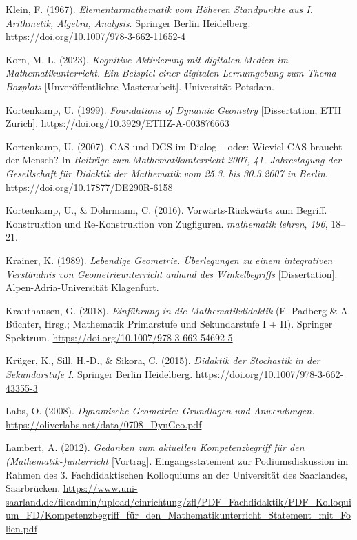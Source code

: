 \documentclass[
]{scrbook}
\newlength{\cslhangindent}
\newenvironment{CSLReferences}[2] %
 {\begin{list}{}{%
  \setlength{\itemindent}{0pt}
  \setlength{\leftmargin}{0pt}
  \setlength{\parsep}{0pt}
  \ifodd #1
   \setlength{\leftmargin}{\cslhangindent}
   \setlength{\itemindent}{-1\cslhangindent}
  \fi
  \setlength{\itemsep}{#2\baselineskip}}}
 {\end{list}}
\theoremstyle{definition}
\theoremstyle{definition}
\theoremstyle{definition}
\theoremstyle{definition}
\theoremstyle{remark}
\begin{document}
\begin{CSLReferences}{1}{0}
Klein, F. (1967). \emph{Elementarmathematik vom {Höheren} {Standpunkte} aus {I}. {Arithmetik}, {Algebra}, {Analysis}}. Springer Berlin Heidelberg. \url{https://doi.org/10.1007/978-3-662-11652-4}

Korn, M.-L. (2023). \emph{Kognitive Aktivierung mit digitalen Medien im Mathematikunterricht. Ein Beispiel einer digitalen Lernumgebung zum Thema Boxplots} {[}Unveröffentlichte Masterarbeit{]}. Universität Potsdam.

Kortenkamp, U. (1999). \emph{Foundations of {Dynamic} {Geometry}} {[}Dissertation, ETH Zurich{]}. \url{https://doi.org/10.3929/ETHZ-A-003876663}

Kortenkamp, U. (2007). {CAS} und {DGS} im {Dialog} -- oder: {Wieviel} {CAS} braucht der {Mensch}? In \emph{Beiträge zum {Mathematikunterricht} 2007, 41. {Jahrestagung} der {Gesellschaft} für {Didaktik} der {Mathematik} vom 25.3. bis 30.3.2007 in {Berlin}}. \url{https://doi.org/10.17877/DE290R-6158}

Kortenkamp, U., \& Dohrmann, C. (2016). Vorwärts-{Rückwärts} zum {Begriff}. {Konstruktion} und {Re}-{Konstruktion} von {Zugfiguren}. \emph{mathematik lehren}, \emph{196}, 18--21.

Krainer, K. (1989). \emph{Lebendige {Geometrie}. Überlegungen zu einem integrativen {Verständnis} von {Geometrieunterricht} anhand des {Winkelbegriffs}} {[}Dissertation{]}. Alpen-Adria-Universität Klagenfurt.

Krauthausen, G. (2018). \emph{Einführung in die {Mathematikdidaktik}} (F. Padberg \& A. Büchter, Hrsg.; Mathematik Primarstufe und Sekundarstufe I + II). Springer Spektrum. \url{https://doi.org/10.1007/978-3-662-54692-5}

Krüger, K., Sill, H.-D., \& Sikora, C. (2015). \emph{Didaktik der {Stochastik} in der {Sekundarstufe} {I}}. Springer Berlin Heidelberg. \url{https://doi.org/10.1007/978-3-662-43355-3}

Labs, O. (2008). \emph{Dynamische {Geometrie}: {Grundlagen} und {Anwendungen}.} \url{https://oliverlabs.net/data/0708_DynGeo.pdf}

Lambert, A. (2012). \emph{Gedanken zum aktuellen {Kompetenzbegriff} für den ({Mathematik}-)unterricht} {[}Vortrag{]}. Eingangsstatement zur Podiumsdiskussion im Rahmen des 3. Fachdidaktischen Kolloquiums an der Universität des Saarlandes, Saarbrücken. \url{https://www.uni-saarland.de/fileadmin/upload/einrichtung/zfl/PDF_Fachdidaktik/PDF_Kolloquium_FD/Kompetenzbegriff_für_den_Mathematikunterricht_Statement_mit_Folien.pdf}


\end{CSLReferences}
\end{document}
